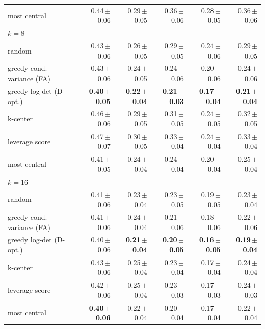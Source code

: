 \begin{tabular}{lrrrrr}
most central & 0.44\,{\scriptsize$\pm$0.06} & 0.29\,{\scriptsize$\pm$0.05} & 0.36\,{\scriptsize$\pm$0.06} & 0.28\,{\scriptsize$\pm$0.05} & 0.36\,{\scriptsize$\pm$0.06} \\
\multicolumn{6}{l}{\emph{$k=8$}} \\
random & 0.43\,{\scriptsize$\pm$0.06} & 0.26\,{\scriptsize$\pm$0.05} & 0.29\,{\scriptsize$\pm$0.05} & 0.24\,{\scriptsize$\pm$0.06} & 0.29\,{\scriptsize$\pm$0.05} \\
greedy cond. variance (FA) & 0.43\,{\scriptsize$\pm$0.06} & 0.24\,{\scriptsize$\pm$0.05} & 0.24\,{\scriptsize$\pm$0.06} & 0.20\,{\scriptsize$\pm$0.06} & 0.24\,{\scriptsize$\pm$0.06} \\
greedy log-det (D-opt.) & \textbf{0.40\,{\scriptsize$\pm$0.05}} & \textbf{0.22\,{\scriptsize$\pm$0.04}} & \textbf{0.21\,{\scriptsize$\pm$0.03}} & \textbf{0.17\,{\scriptsize$\pm$0.04}} & \textbf{0.21\,{\scriptsize$\pm$0.04}} \\
k-center & 0.46\,{\scriptsize$\pm$0.06} & 0.29\,{\scriptsize$\pm$0.05} & 0.31\,{\scriptsize$\pm$0.05} & 0.24\,{\scriptsize$\pm$0.05} & 0.32\,{\scriptsize$\pm$0.05} \\
leverage score & 0.47\,{\scriptsize$\pm$0.07} & 0.30\,{\scriptsize$\pm$0.05} & 0.33\,{\scriptsize$\pm$0.04} & 0.24\,{\scriptsize$\pm$0.04} & 0.33\,{\scriptsize$\pm$0.04} \\
most central & 0.41\,{\scriptsize$\pm$0.05} & 0.24\,{\scriptsize$\pm$0.04} & 0.24\,{\scriptsize$\pm$0.04} & 0.20\,{\scriptsize$\pm$0.04} & 0.25\,{\scriptsize$\pm$0.04} \\
\multicolumn{6}{l}{\emph{$k=16$}} \\
random & 0.41\,{\scriptsize$\pm$0.06} & 0.23\,{\scriptsize$\pm$0.04} & 0.23\,{\scriptsize$\pm$0.05} & 0.19\,{\scriptsize$\pm$0.05} & 0.23\,{\scriptsize$\pm$0.04} \\
greedy cond. variance (FA) & 0.41\,{\scriptsize$\pm$0.06} & 0.24\,{\scriptsize$\pm$0.04} & 0.21\,{\scriptsize$\pm$0.06} & 0.18\,{\scriptsize$\pm$0.06} & 0.22\,{\scriptsize$\pm$0.06} \\
greedy log-det (D-opt.) & 0.40\,{\scriptsize$\pm$0.06} & \textbf{0.21\,{\scriptsize$\pm$0.04}} & \textbf{0.20\,{\scriptsize$\pm$0.05}} & \textbf{0.16\,{\scriptsize$\pm$0.05}} & \textbf{0.19\,{\scriptsize$\pm$0.04}} \\
k-center & 0.43\,{\scriptsize$\pm$0.06} & 0.25\,{\scriptsize$\pm$0.04} & 0.23\,{\scriptsize$\pm$0.04} & 0.17\,{\scriptsize$\pm$0.04} & 0.24\,{\scriptsize$\pm$0.04} \\
leverage score & 0.42\,{\scriptsize$\pm$0.06} & 0.25\,{\scriptsize$\pm$0.04} & 0.23\,{\scriptsize$\pm$0.03} & 0.17\,{\scriptsize$\pm$0.03} & 0.24\,{\scriptsize$\pm$0.03} \\
most central & \textbf{0.40\,{\scriptsize$\pm$0.06}} & 0.22\,{\scriptsize$\pm$0.04} & 0.20\,{\scriptsize$\pm$0.04} & 0.17\,{\scriptsize$\pm$0.04} & 0.22\,{\scriptsize$\pm$0.04} \\
\bottomrule
\end{tabular}
